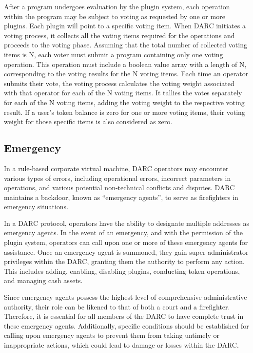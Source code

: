 \documentclass[main.tex]{subfiles}
\begin{document}
After a program undergoes evaluation by the plugin system, each operation within the program may be subject to voting as requested by one or more plugins. Each plugin will point to a specific voting item. When DARC initiates a voting process, it collects all the voting items required for the operations and proceeds to the voting phase. Assuming that the total number of collected voting items is N, each voter must submit a program containing only one voting operation. This operation must include a boolean value array with a length of N, corresponding to the voting results for the N voting items. Each time an operator submits their vote, the voting process calculates the voting weight associated with that operator for each of the N voting items. It tallies the votes separately for each of the N voting items, adding the voting weight to the respective voting result. If a user's token balance is zero for one or more voting items, their voting weight for those specific items is also considered as zero.

\subsection{Emergency}

In a rule-based corporate virtual machine, DARC operators may encounter various types of errors, including operational errors, incorrect parameters in operations, and various potential non-technical conflicts and disputes. DARC maintains a backdoor, known as ``emergency agents'', to serve as firefighters in emergency situations.

In a DARC protocol, operators have the ability to designate multiple addresses as emergency agents. In the event of an emergency, and with the permission of the plugin system, operators can call upon one or more of these emergency agents for assistance. Once an emergency agent is summoned, they gain super-administrator privileges within the DARC, granting them the authority to perform any action. This includes adding, enabling, disabling plugins, conducting token operations, and managing cash assets.

Since emergency agents possess the highest level of comprehensive administrative authority, their role can be likened to that of both a court and a firefighter. Therefore, it is essential for all members of the DARC to have complete trust in these emergency agents. Additionally, specific conditions should be established for calling upon emergency agents to prevent them from taking untimely or inappropriate actions, which could lead to damage or losses within the DARC.
\end{document}
